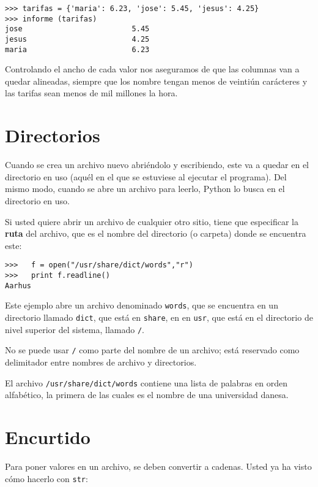 \beforeverb
\begin{verbatim}
>>> tarifas = {'maria': 6.23, 'jose': 5.45, 'jesus': 4.25}
>>> informe (tarifas)
jose                         5.45
jesus                        4.25
maria                        6.23
\end{verbatim}
\afterverb
%
Controlando el ancho de cada valor nos aseguramos de que las columnas
van a quedar alineadas, siempre que los nombre tengan menos de veintiún
carácteres y las tarifas sean menos de mil millones la hora.


\section{Directorios}

Cuando se crea un archivo nuevo abriéndolo y escribiendo, este 
va a quedar en el directorio en uso (aquél en el que se estuviese al ejecutar
el programa). Del mismo modo, cuando se abre un archivo para leerlo,
Python lo busca en el directorio en uso.

Si usted quiere abrir un archivo de cualquier otro sitio, tiene que
especificar la {\bf ruta} del archivo, que es el nombre del directorio
(o carpeta) donde se encuentra este:

\beforeverb
\begin{verbatim}
>>>   f = open("/usr/share/dict/words","r")
>>>   print f.readline()
Aarhus
\end{verbatim}
\afterverb
%
Este ejemplo abre un archivo denominado \texttt{words}, que se encuentra en un
directorio llamado \texttt{dict}, que está en \texttt{share}, en
en \texttt{usr}, que está en el directorio de nivel superior del
sistema, llamado \texttt{/}.


No se puede usar \texttt{/} como parte del nombre de un archivo; está
reservado como delimitador entre nombres de archivo y directorios.

El archivo \texttt{/usr/share/dict/words} contiene una lista de palabras
en orden alfabético, la primera de las cuales es el nombre de una
universidad danesa.


\section{Encurtido}

Para poner valores en un archivo,  se deben convertir a cadenas. 
Usted ya ha visto cómo hacerlo con \texttt{str}:

